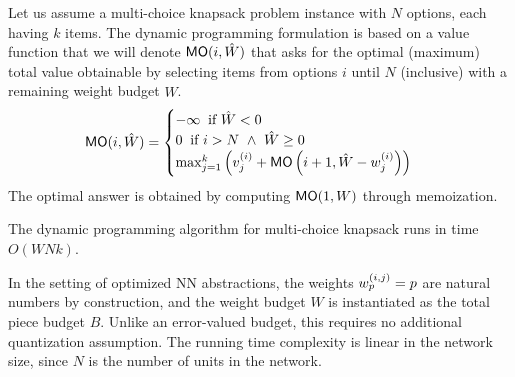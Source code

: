 Let us assume a multi-choice knapsack problem instance with $N$ options, each having $k$ items. The dynamic programming formulation is based on a value function
that we will denote $\mathsf{MO}(i, \hat{W})$ that asks for the optimal (maximum) total value obtainable by selecting items from options $i$ until $N$ (inclusive) with a remaining weight budget $\hat{W}$.
\begin{equation*}
    \mathsf{MO}(i, \hat{W}) = \begin{cases}
		-\infty\;\; \text{if}\ \hat{W} < 0                                                                                   \\
		0 \;\; \text{if}\  i > N \ \land\ \hat{W} \geq 0                                                                    \\
		\max_{j=1}^k \left( v^{(i)}_{j} + \mathsf{MO}\left(i+1, \hat{W} - w^{(i)}_{j} \right) \right) \;\; \\
	\end{cases}
\end{equation*}
The optimal answer is obtained by computing $\mathsf{MO}(1, W)$ through memoization.
\begin{theorem}
	The  dynamic programming algorithm for multi-choice knapsack runs in time $O(W N k)$.
\end{theorem}
In the setting of optimized NN abstractions, the weights $w^{(i,j)}_{p} = p$ are natural numbers by construction, and the weight budget $W$ is instantiated as the total piece budget $B$. Unlike an error-valued budget, this requires no additional quantization assumption. The running time complexity is linear in the network size, since $N$ is the number of units in the network.

